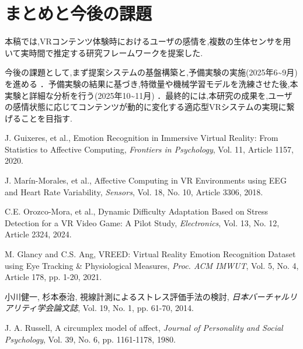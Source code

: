 \documentclass[paper=a4paper,fontsize=10pt,jafontscale=0.925,twocolumn]{jlreq}
\begin{document}
\section{まとめと今後の課題}

本稿では,VRコンテンツ体験時におけるユーザの感情を,複数の生体センサを用いて実時間で推定する研究フレームワークを提案した.

今後の課題として,まず提案システムの基盤構築と,予備実験の実施(2025年6\textasciitilde9月)を進める ．予備実験の結果に基づき,特徴量や機械学習モデルを洗練させた後,本実験と詳細な分析を行う(2025年10\textasciitilde11月) ．最終的には,本研究の成果を,ユーザの感情状態に応じてコンテンツが動的に変化する適応型VRシステムの実現に繋げることを目指す.

\begin{thebibliography}{10}

J. Guixeres, et al., Emotion Recognition in Immersive Virtual Reality: From Statistics to Affective Computing, \textit{Frontiers in Psychology}, Vol. 11, Article 1157, 2020.
    
J. Marín-Morales, et al., Affective Computing in VR Environments using EEG and Heart Rate Variability, \textit{Sensors}, Vol. 18, No. 10, Article 3306, 2018.
    
C.E. Orozco-Mora, et al., Dynamic Difficulty Adaptation Based on Stress Detection for a VR Video Game: A Pilot Study, \textit{Electronics}, Vol. 13, No. 12, Article 2324, 2024.
    
M. Glancy and C.S. Ang, VREED: Virtual Reality Emotion Recognition Dataset using Eye Tracking \& Physiological Measures, \textit{Proc. ACM IMWUT}, Vol. 5, No. 4, Article 178, pp. 1-20, 2021.

小川健一, 杉本泰治, 視線計測によるストレス評価手法の検討, \textit{日本バーチャルリアリティ学会論文誌}, Vol. 19, No. 1, pp. 61-70, 2014. 

J. A. Russell, A circumplex model of affect, \textit{Journal of Personality and Social Psychology}, Vol. 39, No. 6, pp. 1161-1178, 1980.

\end{thebibliography}
\end{document}

